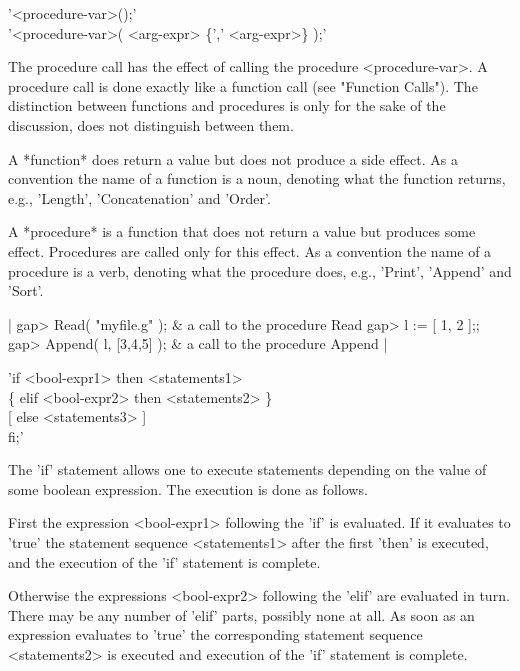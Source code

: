 
'<procedure-var>();' \\
'<procedure-var>( <arg-expr> \{',' <arg-expr>\} );'

The   procedure  call   has   the   effect   of  calling   the  procedure
<procedure-var>.   A  procedure call is done exactly like a function call
(see "Function Calls").  The distinction between functions and procedures
is only for the  sake  of  the discussion,  {\GAP} does  not  distinguish
between them.

A *function* does return a value but does not produce a  side effect.  As
a convention the name of a function is a noun, denoting what the function
returns, e.g., 'Length', 'Concatenation' and 'Order'.

A *procedure* is a  function that does  not return  a value but  produces
some   effect.  Procedures  are called   only  for   this effect.  As   a
convention the name of a procedure is a verb, denoting what the procedure
does, e.g., 'Print', 'Append' and 'Sort'.

|    gap> Read( "myfile.g" );     & a call to the procedure Read
    gap> l := [ 1, 2 ];;
    gap> Append( l, [3,4,5] );    & a call to the procedure Append |

%
%

'if <bool-expr1>  then <statements1> \\
\{ elif <bool-expr2>  then <statements2> \} \\
{}[ else <statements3> ] \\
fi;'

The 'if' statement  allows  one  to  execute statements depending  on the
value of some boolean expression. The execution is done as follows.

First the expression <bool-expr1> following the 'if' is evaluated.  If it
evaluates to 'true' the statement sequence  <statements1> after the first
'then' is executed, and the execution of the 'if' statement is complete.

Otherwise the expressions <bool-expr2> following the 'elif' are evaluated
in turn.  There may  be any number of 'elif' parts, possibly none at all.
As soon  as an expression evaluates to 'true' the corresponding statement
sequence <statements2> is executed and execution of the 'if' statement is
complete.


